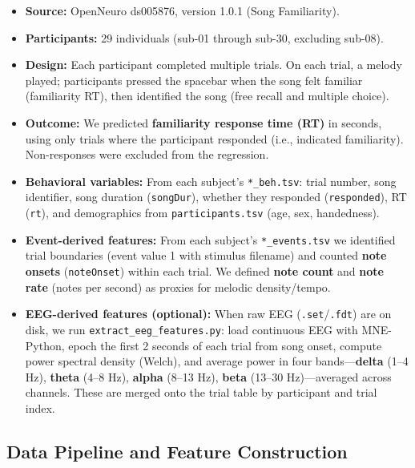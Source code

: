 \documentclass[11pt,a4paper]{article}
\begin{document}
\begin{itemize}[leftmargin=*]
    \item \textbf{Source:} OpenNeuro ds005876, version 1.0.1 (Song Familiarity).
    \item \textbf{Participants:} 29 individuals (sub-01 through sub-30, excluding sub-08).
    \item \textbf{Design:} Each participant completed multiple trials. On each trial, a melody played; participants pressed the spacebar when the song felt familiar (familiarity RT), then identified the song (free recall and multiple choice).
    \item \textbf{Outcome:} We predicted \textbf{familiarity response time (RT)} in seconds, using only trials where the participant responded (i.e., indicated familiarity). Non-responses were excluded from the regression.
    \item \textbf{Behavioral variables:} From each subject's \texttt{*\_beh.tsv}: trial number, song identifier, song duration (\texttt{songDur}), whether they responded (\texttt{responded}), RT (\texttt{rt}), and demographics from \texttt{participants.tsv} (age, sex, handedness).
    \item \textbf{Event-derived features:} From each subject's \texttt{*\_events.tsv} we identified trial boundaries (event value 1 with stimulus filename) and counted \textbf{note onsets} (\texttt{noteOnset}) within each trial. We defined \textbf{note count} and \textbf{note rate} (notes per second) as proxies for melodic density/tempo.
    \item \textbf{EEG-derived features (optional):} When raw EEG (\texttt{.set}/\texttt{.fdt}) are on disk, we run \texttt{extract\_eeg\_features.py}: load continuous EEG with MNE-Python, epoch the first 2 seconds of each trial from song onset, compute power spectral density (Welch), and average power in four bands---\textbf{delta} (1--4 Hz), \textbf{theta} (4--8 Hz), \textbf{alpha} (8--13 Hz), \textbf{beta} (13--30 Hz)---averaged across channels. These are merged onto the trial table by participant and trial index.
\end{itemize}

\subsection{Data Pipeline and Feature Construction}
\end{document}
